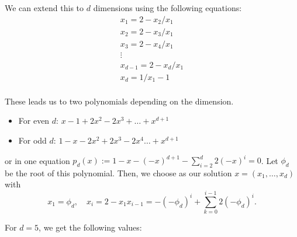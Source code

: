 \documentclass[english,version-2020-11]{uzl-thesis}
\begin{document}
We can extend this to $d$ dimensions using the following equations:
\begin{align*}
  x_1 = 2 - x_2 / x_1 \\
  x_2 = 2 - x_3 / x_1 \\
  x_3 = 2 - x_4 / x_1 \\
  \vdots \\
  x_{d-1} = 2 - x_d / x_1 \\
  x_d = 1 / x_1 - 1 \\
\end{align*}

These leads us to two polynomials depending on the dimension.
\begin{itemize}
  \item For even $d$: $x - 1 + 2 x^2 - 2 x^3 + \dots + x^{d+1}$
  \item For odd $d$: $1 - x - 2 x^2 + 2 x^3 - 2 x^4 \dots + x^{d+1}$
\end{itemize}
or in one equation $p_d(x) := 1 - x - (-x)^{d+1} - \sum_{i = 2}^{d} 2 (-x)^{i} = 0$.
Let $\phi_d$ be the root of this polynomial.
Then, we choose as our solution $x = (x_1, \dots, x_d)$ with
\begin{equation}
  \label{eq:rotate-solution}
  x_1 = \phi_d, \quad x_i = 2 - x_1 x_{i-1} = -(-\phi_d)^i + \sum_{k=0}^{i-1} 2 (-\phi_d)^i.
\end{equation}

\begin{example}
  For $d = 5$, we get the following values:

\end{example}
\end{document}
